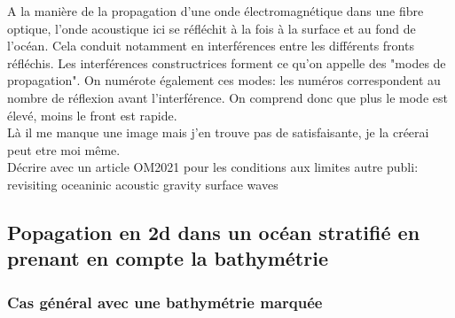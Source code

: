 \documentclass{rapportECC}
\begin{document}
A la manière de la propagation d'une onde électromagnétique dans une fibre optique, l'onde acoustique ici se réfléchit à la fois à la surface et au fond de l'océan. Cela conduit notamment en interférences entre les différents fronts réfléchis. Les interférences constructrices forment ce qu'on appelle des "modes de propagation". On numérote également ces modes: les numéros correspondent au nombre de réflexion avant l'interférence. On comprend donc que plus le mode est élevé, moins le front est rapide. \\
Là il me manque une image mais j'en trouve pas de satisfaisante, je la créerai peut etre moi même.
\\

Décrire avec un article OM2021 pour les conditions aux limites
autre publi: revisiting oceaninic acoustic gravity surface waves

\subsection{Popagation en 2d dans un océan stratifié en prenant en compte la bathymétrie}


\subsubsection{Cas général avec une bathymétrie marquée}
\end{document}
